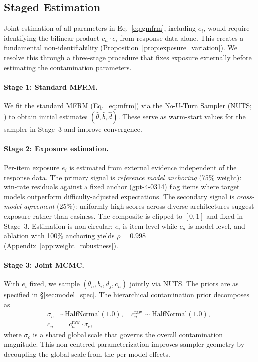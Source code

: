 \subsection{Staged Estimation}
\label{sec:staged}

Joint estimation of all parameters in Eq.~\ref{eq:gmfrm}, including $e_i$, would require identifying the bilinear product $c_n \cdot e_i$ from response data alone. This creates a fundamental non-identifiability (Proposition~\ref{prop:exposure_variation}). We resolve this through a three-stage procedure that fixes exposure externally before estimating the contamination parameters.

\paragraph{Stage 1: Standard MFRM.} We fit the standard MFRM (Eq.~\ref{eq:mfrm}) via the No-U-Turn Sampler (NUTS; \citealp{betancourt2015}) to obtain initial estimates $(\hat{\theta}, \hat{b}, \hat{d})$. These serve as warm-start values for the sampler in Stage~3 and improve convergence.

\paragraph{Stage 2: Exposure estimation.} Per-item exposure $e_i$ is estimated from external evidence independent of the response data. The primary signal is \emph{reference model anchoring} (75\% weight): win-rate residuals against a fixed anchor (gpt-4-0314) flag items where target models outperform difficulty-adjusted expectations. The secondary signal is \emph{cross-model agreement} (25\%): uniformly high scores across diverse architectures suggest exposure rather than easiness. The composite is clipped to $[0, 1]$ and fixed in Stage~3. Estimation is non-circular: $e_i$ is item-level while $c_n$ is model-level, and ablation with 100\% anchoring yields $\rho = 0.998$ (Appendix~\ref{app:weight_robustness}).

\paragraph{Stage 3: Joint MCMC.} With $e_i$ fixed, we sample $(\theta_n, b_i, d_j, c_n)$ jointly via NUTS. The priors are as specified in \S\ref{sec:model_spec}. The hierarchical contamination prior decomposes as
%
\begin{align}
\label{eq:contam_prior}
\sigma_c &\sim \text{HalfNormal}(1.0), \quad c^{\mathrm{raw}}_n \sim \text{HalfNormal}(1.0), \nonumber \\
c_n &= c^{\mathrm{raw}}_n \cdot \sigma_c,
\end{align}
%
where $\sigma_c$ is a shared global scale that governs the overall contamination magnitude. This non-centered parameterization improves sampler geometry by decoupling the global scale from the per-model effects.


